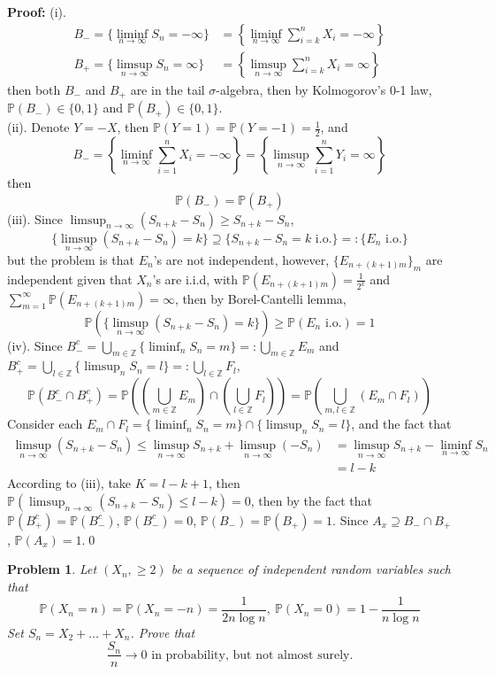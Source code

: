 \documentclass[12pt]{article}
\newtheorem{problem}{Problem}
\begin{document}
\textbf{Proof:} (i). 
\begin{align*}
    B_-=\{\liminf_{n\to\infty}S_n=-\infty\}&=\left\{\liminf_{n\to\infty}\sum_{i=k}^n X_i=-\infty\right\} \\
    B_+=\{\limsup_{n\to\infty}S_n=\infty\}&=\left\{\limsup_{n\to\infty}\sum_{i=k}^n X_i=\infty\right\}
\end{align*}
then both $B_-$ and $B_+$ are in the tail $\sigma$-algebra, then by Kolmogorov's 0-1 law, $\mathbb{P}(B_-)\in\{0,1\}$ and $\mathbb{P}(B_+)\in\{0,1\}$. \\
\indent (ii). Denote $Y=-X$, then $\mathbb{P}(Y=1)=\mathbb{P}(Y=-1)=\frac{1}{2}$, and 
$$
    B_-=\left\{\liminf_{n\to\infty}\sum_{i=1}^n X_i=-\infty\right\}=\left\{\limsup_{n\to\infty}\sum_{i=1}^nY_i=\infty\right\}
$$
then 
$$
    \mathbb{P}(B_-)=\mathbb{P}(B_+)
$$
\indent (iii). Since $\limsup_{n\to\infty}(S_{n+k}-S_n)\geq S_{n+k}-S_n$, 
$$
    \{\limsup_{n\to\infty}(S_{n+k}-S_n)=k\}\supseteq \{S_{n+k}-S_n=k\text{ i.o.}\}=:\{E_n\text{ i.o.}\}
$$
but the problem is that $E_n$'s are not independent, however, $\{E_{n+(k+1)m}\}_m$ are independent given that $X_n$'s are i.i.d, with $\mathbb{P}(E_{n+(k+1)m})=\frac{1}{2^k}$ and $\sum\limits_{m=1}^\infty\mathbb{P}(E_{n+(k+1)m})=\infty$, then by Borel-Cantelli lemma, 
$$
    \mathbb{P}(\{\limsup_{n\to\infty}(S_{n+k}-S_n)=k\})\geq\mathbb{P}(E_n \text{ i.o.})=1
$$
\indent (iv). Since $B_-^c=\bigcup_{m\in\mathbb{Z}}\{\liminf_{n}S_n=m\}=:\bigcup_{m\in\mathbb{Z}}E_m$ and $B_+^c=\bigcup_{l\in\mathbb{Z}}\{\limsup_{n}S_n=l\}=:\bigcup_{l\in\mathbb{Z}}F_l$, 
$$
    \mathbb{P}(B_-^c\cap B_+^c)=\mathbb{P}\left(\left(\bigcup_{m\in\mathbb{Z}}E_m\right)\cap\left(\bigcup_{l\in\mathbb{Z}}F_l\right)\right)=\mathbb{P}\left(\bigcup_{m,l\in\mathbb{Z}}(E_m\cap F_l)\right)
$$
Consider each $E_m\cap F_l=\{\liminf_{n}S_n=m\}\cap\{\limsup_nS_n=l\}$, and the fact that 
\begin{align*}
    \limsup_{n\to\infty}(S_{n+k}-S_n)\leq \limsup_{n\to\infty}S_{n+k}+\limsup_{n\to\infty}(-S_n)&=\limsup_{n\to\infty}S_{n+k}-\liminf_{n\to\infty}S_n \\
    &= l-k
\end{align*}
According to (iii), take $K=l-k+1$, then $\mathbb{P}(\limsup_{n\to\infty}(S_{n+k}-S_n)\leq l-k)=0$, then by the fact that $\mathbb{P}(B_+^c)=\mathbb{P}(B_-^c)$, $\mathbb{P}(B_-^c)=0$, $\mathbb{P}(B_-)=\mathbb{P}(B_+)=1$. Since $A_x\supseteq B_-\cap B_+$, $\mathbb{P}(A_x)=1$.\qed
\\
\begin{problem}
    Let $(X_n, \geq 2)$ be a sequence of independent random variables such that 
    $$
        \mathbb{P}(X_n=n)=\mathbb{P}(X_n=-n)=\frac{1}{2n\log n}, \ \mathbb{P}(X_n=0)=1-\frac{1}{n\log n}
    $$
    Set $S_n=X_2+\dots+X_n$. Prove that 
    $$
        \frac{S_n}{n}\to 0 \text{ in probability, but not almost surely.}
    $$
\end{problem}
\end{document}
